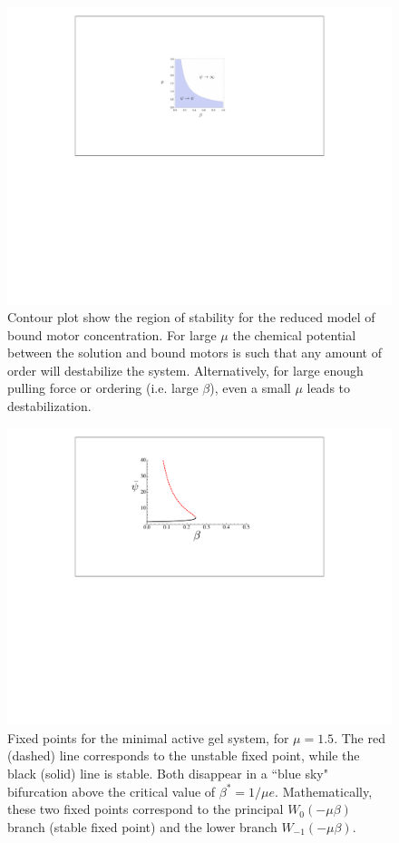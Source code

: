 \documentclass[onecolumn,showpacs,preprintnumbers,prl,amsmath,amssymb]{revtex4-1}
\begin{document}
\begin{figure}
\includegraphics[width=.75\textwidth] {fig1}
\caption{\label{contour} Contour plot show the region of stability for the reduced model of bound motor concentration. For large $\mu$ the chemical potential between the solution and bound motors is such that any amount of order will destabilize the system. Alternatively, for large enough pulling force or ordering (i.e. large $\beta$), even a small $\mu$ leads to destabilization.  }
\end{figure}

\begin{figure}
\includegraphics[width=.75\textwidth] {fig2}
\caption{\label{fixedpts} Fixed points for the minimal active gel system, for $\mu=1.5$. The red (dashed) line corresponds to the unstable fixed point, while the black (solid) line is stable. Both disappear in a ``blue sky" bifurcation above the critical value of $\beta^*=1/\mu e$. Mathematically, these two fixed points correspond to the principal $W_0(-\mu\beta)$ branch (stable fixed point) and the lower branch $W_{-1}(-\mu\beta)$.}
\end{figure}
\end{document}
